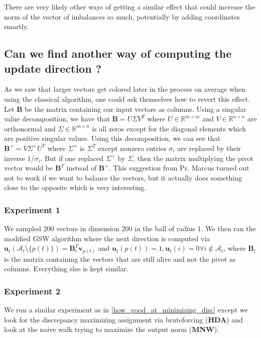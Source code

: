 \documentclass[12pt]{article}
\begin{document}
There are very likely other ways of getting a similar effect that could increase the norm of the vector of imbalances so much, potentially by adding coordinates smartly.

\subsection{Can we find another way of computing the update direction ?}
 As we saw that larger vectors get colored later in the process on average when using the classical algorithm, one could ask themselves how to revert this effect. Let $\textbf{B}$ be the matrix containing our input vectors as columns. Using a singular value decomposition, we have that $\textbf{B}=U\Sigma V^T$ where $U\in\mathbb{R}^{m\times m}$ and $V\in\mathbb{R}^{n\times n}$ are orthonormal and $\Sigma\in\mathbb{R}^{m\times n}$ is all zeros except for the diagonal elements which are positive singular values. Using this decomposition, we can see that $\textbf{B}^+=V\Sigma^+U^T$ where $\Sigma^+$ is $\Sigma^T$ except nonzero entries $\sigma_i$ are replaced by their inverse $1/\sigma_i$. But if one replaced $\Sigma^+$ by $\Sigma$, then the  matrix multiplying the pivot vector would be $\textbf{B}^T$ instead of $\textbf{B}^+$. This suggestion from Pr. Marcus turned out not to work if we want to balance the vectors, but it actually does something close to the opposite which is very interesting. 

\subsubsection{Experiment 1}\label{exp1_A_T}

We sampled 200 vectors in dimension 200 in the ball of radius 1. We then ran the modified GSW algorithm where the next direction is computed via $\textbf{u}_t(\mathcal{A}_t\setminus\{p(t)\})=\textbf{B}_t^T\textbf{v}_{p(t)}$ and $\textbf{u}_t(p(t))=1, \textbf{u}_t(i)=0 \forall i\not\in\mathcal{A}_t$, where $\textbf{B}_t$ is the matrix containing the vectors that are still alive and not the pivot as columns. Everything else is kept similar. 

\subsubsection{Experiment 2}\label{exp2_A_T}


We run a similar experiment as in \ref{how_good_at_minimizing_disc} except we look for the discrepancy maximizing assignment via bruteforcing (\textbf{HDA}) and look at the naive walk trying to maximize the output norm (\textbf{MNW}).
\end{document}
